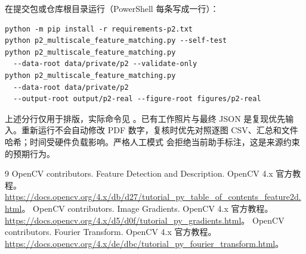 在提交包或仓库根目录运行（PowerShell 每条写成一行）：
\begin{verbatim}
python -m pip install -r requirements-p2.txt
python p2_multiscale_feature_matching.py --self-test
python p2_multiscale_feature_matching.py
  --data-root data/private/p2 --validate-only
python p2_multiscale_feature_matching.py
  --data-root data/private/p2
  --output-root output/p2-real --figure-root figures/p2-real
\end{verbatim}
上述分行仅用于排版，实际命令见 。已有工作照片与最终 JSON 是复现优先输入。重新运行不会自动修改 PDF 数字，复核时优先对照逐图 CSV、汇总和文件哈希；时间受硬件负载影响。严格人工模式  会拒绝当前助手标注，这是来源约束的预期行为。

\clearpage
\begin{thebibliography}{9}
\small
{} OpenCV contributors. Feature Detection and Description. OpenCV 4.x 官方教程。\url{https://docs.opencv.org/4.x/db/d27/tutorial_py_table_of_contents_feature2d.html}。
 OpenCV contributors. Image Gradients. OpenCV 4.x 官方教程。\url{https://docs.opencv.org/4.x/d5/d0f/tutorial_py_gradients.html}。
 OpenCV contributors. Fourier Transform. OpenCV 4.x 官方教程。\url{https://docs.opencv.org/4.x/de/dbc/tutorial_py_fourier_transform.html}。
\end{thebibliography}

